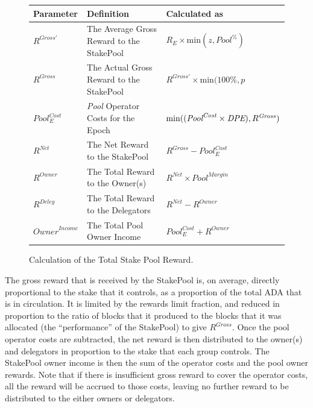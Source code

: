 \documentclass[11pt,a4paper,dvipsnames,twosided,final]{article}
\newcommand{\khcomment}[1]{\todo[color=blue!20]{KH: #1}}
\newcommand{\ada}{ADA{}}
\begin{document}
\clearpage
\begin{figure}[h!]
\begin{center}
\begin{tabular}{||l|p{7.8cm}|l||}
  \hline \hline
\textbf{Parameter}  & \textbf{Definition} & \textbf{Calculated as} \\\hline
$R^{Gross'}$ & The Average Gross Reward to the StakePool & $R_E \times \textrm{min} (z,{\textit{Pool}}^\%)$ \\\hline
$R^{\textit{Gross}}$ & The Actual Gross Reward to the StakePool & $R^{Gross'} \times \textrm{min} (100\%,p$ \\\hline
${\textit{Pool}}^{\textit{Cost}}_E$ & \textit{Pool} Operator Costs for the Epoch & $\textrm{min}((\textit{\textit{Pool}}^{\textit{Cost}} \times \textit{DPE}),R^{\textit{Gross}})$ \\\hline
$R^{\textit{Net}}$  & The Net Reward to the StakePool & $R^{\textit{Gross}} - {\textit{Pool}}^{\textit{Cost}}_E$ \\\hline
$R^{Owner}$ & The Total Reward to the Owner(s) & $R^{\textit{Net}} \times {\textit{Pool}}^{\textit{Margin}} $ \\\hline
$R^{Deleg}$ & The Total Reward to the Delegators & $R^{\textit{Net}} - R^{Owner}$ \\\hline
$\textit{Owner}^\textit{Income}$ & The Total Pool Owner Income & ${\textit{Pool}}^{\textit{Cost}}_E + R^{Owner}$ \\\hline
\hline
\end{tabular}
\end{center}
\caption{Calculation of the Total Stake Pool Reward.}
\end{figure}

\noindent
The gross reward that is received by the StakePool is, on average, directly proportional to the
stake that it controls, as a proportion of the total \ada{} that is in circulation.
It is limited by the rewards limit fraction, and reduced in proportion to the ratio of blocks that it produced
to the blocks that it was allocated (the ``performance'' of the StakePool) to give $R^{\textit{Gross}}$.
Once the pool operator costs are subtracted,
the net reward is then distributed to the owner(s) and delegators in proportion to the
stake that each group controls.  The StakePool owner income is then the sum of the operator costs and the pool owner rewards.
Note that if there is insufficient gross reward to cover the operator costs, all the reward will be accrued to those
costs, leaving no further reward to be distributed to the either owners or delegators.
\end{document}
